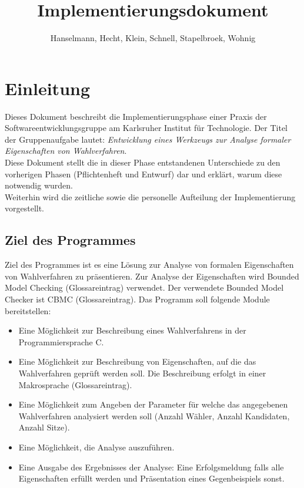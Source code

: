 \documentclass[a4paper]{scrreprt}
\begin{document}
\title{Implementierungsdokument}
\author{Hanselmann, Hecht, Klein, Schnell, Stapelbroek, Wohnig}
\maketitle 
\tableofcontents	
\listoffigures


\chapter{Einleitung}
Dieses Dokument beschreibt die Implementierungsphase einer Praxis der Softwareentwicklungsgruppe am Karlsruher Institut für Technologie. Der Titel der Gruppenaufgabe lautet: \textit{Entwicklung eines Werkzeugs zur Analyse formaler Eigenschaften von Wahlverfahren}. \\
Diese Dokument stellt die in dieser Phase entstandenen Unterschiede zu den vorherigen Phasen (Pflichtenheft und Entwurf) dar und erklärt, warum diese notwendig wurden. \\
Weiterhin wird die zeitliche sowie die personelle Aufteilung der Implementierung vorgestellt. \\
\section{Ziel des Programmes}
Ziel des Programmes ist es eine Lösung zur Analyse von formalen Eigenschaften von Wahlverfahren zu präsentieren. Zur Analyse der Eigenschaften wird Bounded Model Checking (Glossareintrag) verwendet. Der verwendete Bounded Model Checker ist CBMC (Glossareintrag). Das Programm soll folgende Module  bereitstellen: 
\begin{itemize}
\item Eine Möglichkeit zur Beschreibung eines Wahlverfahrens in der Programmiersprache C. 
\item Eine Möglichkeit zur Beschreibung von Eigenschaften, auf die das Wahlverfahren geprüft werden soll. Die Beschreibung erfolgt in einer Makrosprache (Glossareintrag).
\item Eine Möglichkeit zum Angeben der Parameter für welche das angegebenen Wahlverfahren analysiert werden soll (Anzahl Wähler, Anzahl Kandidaten, Anzahl Sitze). 
\item Eine Möglichkeit, die Analyse auszuführen.
\item Eine Ausgabe des Ergebnisses der Analyse: Eine Erfolgsmeldung falls alle Eigenschaften erfüllt werden und Präsentation eines Gegenbeispiels sonst.
\end{itemize}
\end{document}
